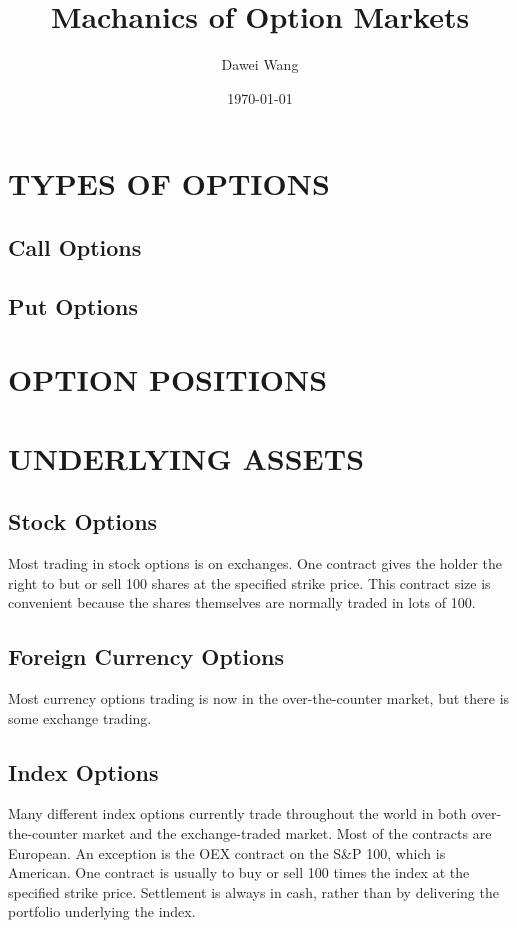 \documentclass{article}
\title{Machanics of Option Markets}
\author{Dawei Wang}
\date{\today}
\begin{document}
	\maketitle
\section{TYPES OF OPTIONS}
\subsection{Call Options}
\subsection{Put Options}

\section{OPTION POSITIONS}

\section{UNDERLYING ASSETS}
\subsection{Stock Options}
Most trading in stock options is on exchanges. One contract gives the holder the right to but or sell 100 shares at the specified strike price. This contract size is convenient because the shares themselves are normally traded in lots of 100.

\subsection{Foreign Currency Options}
Most currency options trading is now in the over-the-counter market, but there is some exchange trading.

\subsection{Index Options}
Many different index options currently trade throughout the world in both over-the-counter market and the exchange-traded market. Most of the contracts are European. An exception is the OEX contract on the S\&P 100, which is American. One contract is usually to buy or sell 100 times the index at the specified strike price. Settlement is  always in cash, rather than by delivering the portfolio underlying the index.
\end{document}
